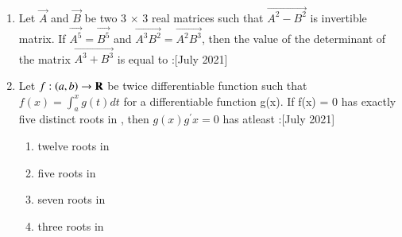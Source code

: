\documentclass[journal,12pt,onecolumn]{IEEEtran}
\theoremstyle{remark}
\begin{document}
\begin{enumerate}
\begin{enumerate}
		\end{enumerate}
	\item Let $\vec{A}$ and $\vec{B}$ be two 3 $\times$ 3 real matrices such that $\vec{A^2 - B^2}$ is invertible matrix. If $\vec{A^5} = \vec{B^5}$ and $\vec{A^3B^2} = \vec{A^2B^3}$, then the value of the determinant of the matrix $\vec{A^3 + B^3}$ is equal to :\hfill{[July 2021]}
		\begin{enumerate}
		\end{enumerate}
	\item Let $ f : \left(a,b\right) \to \mathbf{R}$ be twice differentiable function such that $ f(x) = \int_{a}^{x} g(t) dt$ for a differentiable function g(x). If f(x) = 0 has exactly five distinct roots in , then $g(x)g^{\prime}{x} = 0$ has atleast :\hfill{[July 2021]}
		\begin{enumerate}
			\item twelve roots in \brak{a,b}
			\item five roots in \brak{a,b}
			\item seven roots in \brak{a,b}
			\item three roots in \brak{a,b}
		\end{enumerate}
\end{enumerate}
\end{document}
